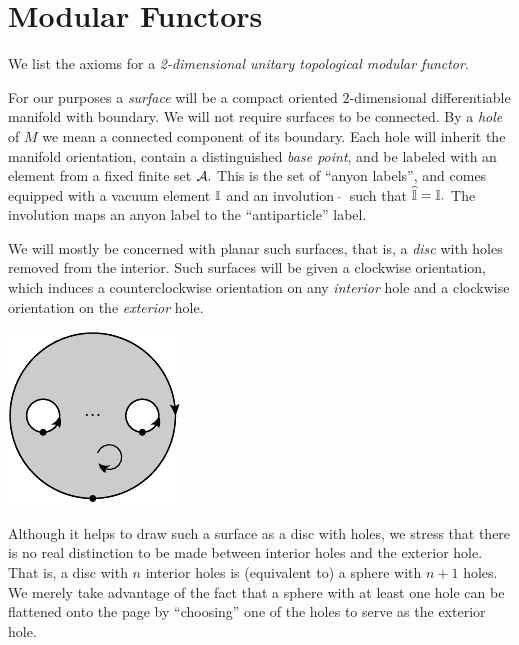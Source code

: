 %
%

\section{Modular Functors}\label{ModularFunctors}

We list the axioms for a 
\emph{2-dimensional unitary topological modular functor}.

For our purposes a \emph{surface} will be a compact
oriented $2$-dimensional differentiable manifold with boundary. %
We will not require surfaces to be connected.
By a \emph{hole} of $M$ we mean a connected component of its boundary. %
Each hole will inherit the manifold orientation,
contain a distinguished \emph{base point},
and be labeled with
an element from a fixed finite set $\mathcal{A}.$
This is the set of ``anyon labels'', and comes
equipped with a vacuum element $\mathbb{I}$ 
and an involution $\ \widehat{}\ $ such that $\widehat{\mathbb{I}}=\mathbb{I}.$
The involution maps an anyon label to the ``antiparticle'' label.

We will mostly be concerned with planar such
surfaces, that is, a \emph{disc} with holes removed from the
interior.
Such surfaces will be given a clockwise 
orientation, which induces a counterclockwise orientation on
any \emph{interior} hole and a clockwise orientation
on the \emph{exterior} hole.
\begin{center}
\includegraphics[]{pic-disc.pdf}
\end{center}
Although it helps to draw such a surface as a disc with holes,
we stress that there is no real distinction to be made between
interior holes and the exterior hole.
That is, 
a disc with $n$ interior holes is (equivalent to) a sphere with $n+1$ holes.
We merely take advantage of the fact that a sphere with at least one hole
can be flattened onto the page by ``choosing'' one of the holes to
serve as the exterior hole.

